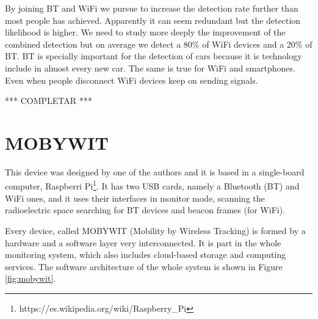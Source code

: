 \documentclass[preprint]{elsarticle}
\begin{document}
By joining BT and WiFi we pursue to increase the detection rate further than most people has achieved. Apparently it can seem redundant but the detection likelihood is higher. We need to study more deeply the improvement of the combined detection but on average we detect a 80\% of WiFi devices and a 20\% of BT. BT is specially important for the detection of cars because it is technology include in almost every new car. The same is true for WiFi and smartphones. Even when people disconnect WiFi devices keep on sending signals.


*** COMPLETAR ***


\section{MOBYWIT}
\label{sec:mobywit}

This device was designed by one of the authors and it is based in a
single-board computer, Raspberri
Pi\footnote{https://es.wikipedia.org/wiki/Raspberry\_Pi}. It has two
USB cards, namely a Bluetooth (BT) and WiFi ones, and it uses their
interfaces in monitor mode, scanning the radioelectric space searching
for BT devices and beacon frames (for WiFi). 

Every device, called MOBYWIT (Mobility by Wireless Tracking) is formed
by a hardware and a software layer very interconnected. It is part in
the whole monitoring system, which also includes cloud-based storage
and computing services. The software architecture of the whole system
is shown in Figure \ref{fig:mobywit}. 
\end{document}
